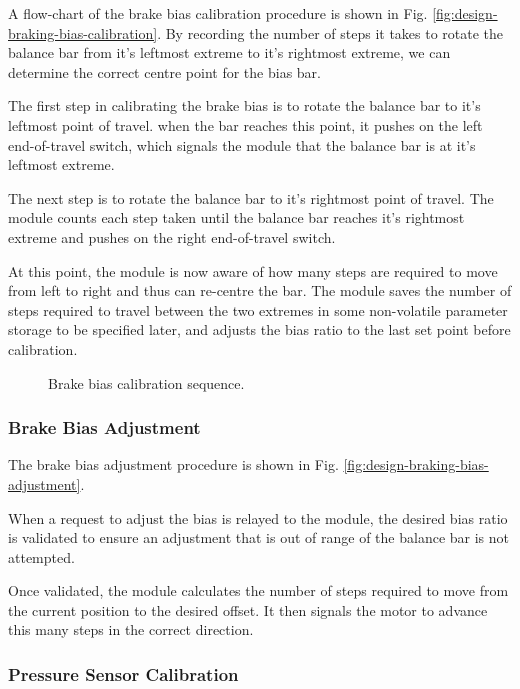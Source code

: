 A flow-chart of the brake bias calibration procedure is shown in Fig. \ref{fig:design-braking-bias-calibration}. By recording the number of steps it takes to rotate the balance bar from it's leftmost extreme to it's rightmost extreme, we can determine the correct centre point for the bias bar. 

The first step in calibrating the brake bias is to rotate the balance bar to it's leftmost point of travel. when the bar reaches this point, it pushes on the left end-of-travel switch, which signals the module that the balance bar is at it's leftmost extreme. 

The next step is to rotate the balance bar to it's rightmost point of travel. The module counts each step taken until the balance bar reaches it's rightmost extreme and pushes on the right end-of-travel switch.

At this point, the module is now aware of how many steps are required to move from left to right and thus can re-centre the bar. The module saves the number of steps required to travel between the two extremes in some non-volatile parameter storage to be specified later, and adjusts the bias ratio to the last set point before calibration.

\begin{figure}
\centering

\caption{Brake bias calibration sequence.}
\label{fig:pneumatics_design}
\end{figure}

\subsubsection{Brake Bias Adjustment}

The brake bias adjustment procedure is shown in Fig. \ref{fig:design-braking-bias-adjustment}. 

When a request to adjust the bias is relayed to the module, the desired bias ratio is validated to ensure an adjustment that is out of range of the balance bar is not attempted. 

Once validated, the module calculates the number of steps required to move from the current position to the desired offset. It then signals the motor to advance this many steps in the correct direction.

\subsubsection{Pressure Sensor Calibration}


